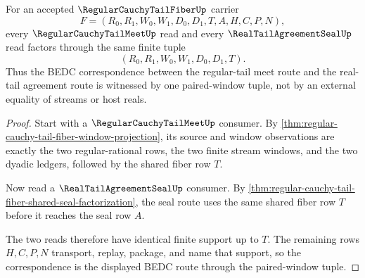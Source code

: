 \begin{theorem}
\label{thm:regular-cauchy-tail-fiber-paired-window-exactness}
For an accepted $\RegularCauchyTailFiberUp$ carrier
$$
F=(R_0,R_1,W_0,W_1,D_0,D_1,T,A,H,C,P,N),
$$
every $\RegularCauchyTailMeetUp$ read and every $\RealTailAgreementSealUp$ read factors through the same finite tuple
$$
(R_0,R_1,W_0,W_1,D_0,D_1,T).
$$
Thus the BEDC correspondence between the regular-tail meet route and the real-tail agreement route is witnessed by one paired-window tuple, not by an external equality of streams or host reals.
\end{theorem}
\begin{proof}
Start with a $\RegularCauchyTailMeetUp$ consumer. By \autoref{thm:regular-cauchy-tail-fiber-window-projection}, its source and window observations are exactly the two regular-rational rows, the two finite stream windows, and the two dyadic ledgers, followed by the shared fiber row $T$.

Now read a $\RealTailAgreementSealUp$ consumer. By \autoref{thm:regular-cauchy-tail-fiber-shared-seal-factorization}, the seal route uses the same shared fiber row $T$ before it reaches the seal row $A$.

The two reads therefore have identical finite support up to $T$. The remaining rows $H,C,P,N$ transport, replay, package, and name that support, so the correspondence is the displayed BEDC route through the paired-window tuple.
\end{proof}

